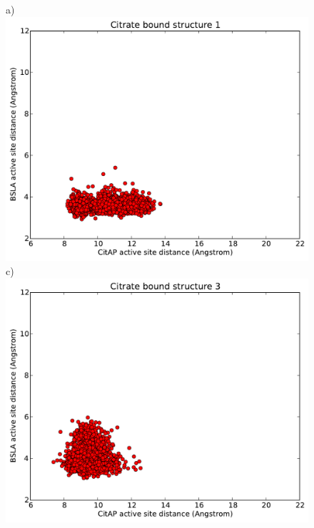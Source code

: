 \documentclass[english, a4paper, 12pt, titlepage, draft]{article}
\begin{document}
\begin{figure}
    \begin{minipage}[]{0.45\linewidth}
        \centering
        a)
        \includegraphics[width=\textwidth]{figures/CitAP_BSLA_distance/BSLA_CitAP_distance_bound_structure1.pdf}  
        c)
        \includegraphics[width=\textwidth]{figures/CitAP_BSLA_distance/BSLA_CitAP_distance_bound_structure3.pdf}  
    \end{minipage}
\hspace{0.5cm}
    \begin{minipage}[]{0.45\linewidth}

\end{minipage}
\end{figure}
\end{document}
